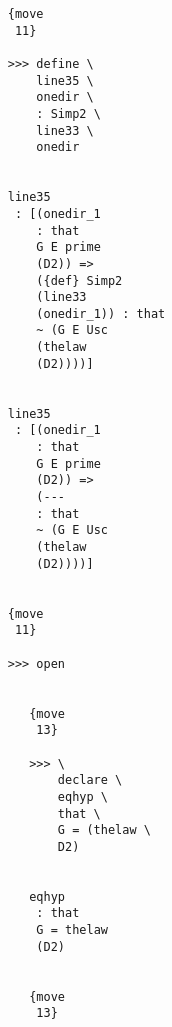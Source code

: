 \documentclass[12pt]{article}
\begin{document}
\begin{verbatim}
                                    {move 
                                     11}

                                    >>> define \
                                        line35 \
                                        onedir \
                                        : Simp2 \
                                        line33 \
                                        onedir


                                    line35 
                                     : [(onedir_1 
                                        : that 
                                        G E prime 
                                        (D2)) => 
                                        ({def} Simp2 
                                        (line33 
                                        (onedir_1)) : that 
                                        ~ (G E Usc 
                                        (thelaw 
                                        (D2))))]


                                    line35 
                                     : [(onedir_1 
                                        : that 
                                        G E prime 
                                        (D2)) => 
                                        (--- 
                                        : that 
                                        ~ (G E Usc 
                                        (thelaw 
                                        (D2))))]


                                    {move 
                                     11}

                                    >>> open


                                       {move 
                                        13}

                                       >>> \
                                           declare \
                                           eqhyp \
                                           that \
                                           G = (thelaw \
                                           D2)


                                       eqhyp 
                                        : that 
                                        G = thelaw 
                                        (D2)


                                       {move 
                                        13}


\end{verbatim}
\end{document}
